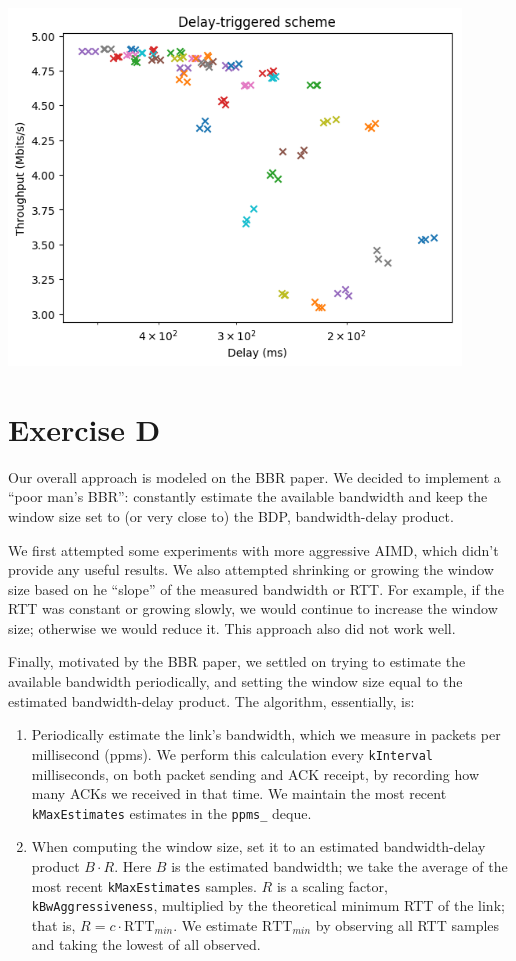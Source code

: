 \documentclass{article}
\begin{document}
\begin{center}
\includegraphics[width=0.9\textwidth]{images/exercise_c.png}
\end{center}

\section*{Exercise D}
Our overall approach is modeled on the BBR paper. We decided to implement a ``poor man's BBR'': constantly estimate the available bandwidth and keep the window size set to (or very close to) the BDP, bandwidth-delay product.

We first attempted some experiments with more aggressive AIMD, which didn't provide any useful results. We also attempted shrinking or growing the window size based on he ``slope'' of the measured bandwidth or RTT. For example, if the RTT was constant or growing slowly, we would continue to increase the window size; otherwise we would reduce it. This approach also did not work well.

Finally, motivated by the BBR paper, we settled on trying to estimate the available bandwidth periodically, and setting the window size equal to the estimated bandwidth-delay product. The algorithm, essentially, is:

\begin{enumerate}
    \item Periodically estimate the link's bandwidth, which we measure in packets per millisecond (ppms). We perform this calculation every \texttt{kInterval} milliseconds, on both packet sending and ACK receipt, by recording how many ACKs we received in that time. We maintain the most recent \texttt{kMaxEstimates} estimates in the \texttt{ppms\_} deque.
    \item When computing the window size, set it to an estimated bandwidth-delay product $B \cdot R$. Here $B$ is the estimated bandwidth; we take the average of the most recent \texttt{kMaxEstimates} samples. $R$ is a scaling factor, \texttt{kBwAggressiveness}, multiplied by the theoretical minimum RTT of the link; that is, $R = c \cdot \text{RTT}_{min}$. We estimate $\text{RTT}_{min}$ by observing all RTT samples and taking the lowest of all observed.
\end{enumerate}
\end{document}

